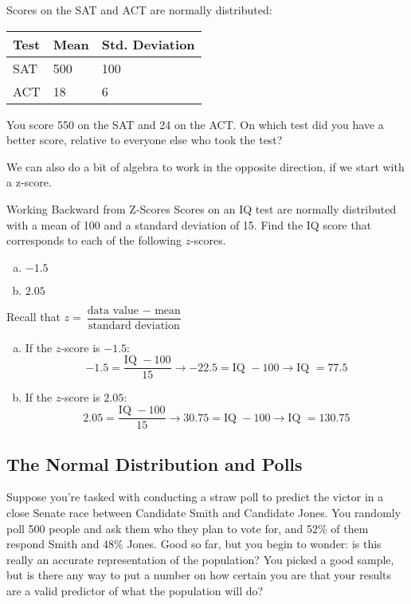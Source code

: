 \begin{try}
Scores on the SAT and ACT are normally distributed:
\begin{center}
\begin{tabular}{l l l}
Test & Mean & Std. Deviation\\
\hline
SAT & 500 & 100\\
ACT & 18 & 6
\end{tabular}
\end{center}
You score 550 on the SAT and 24 on the ACT.  On which test did you have a better score, relative to everyone else who took the test?
\end{try}

We can also do a bit of algebra to work in the opposite direction, if we start with a z-score.

\begin{example}[https://www.youtube.com/watch?v=qfg_DWgY3Hg&list=PLfmpjsIzhzttL_Uec2nCbDRcAcUF7NKG8&index=27]{Working Backward from Z-Scores}
Scores on an IQ test are normally distributed with a mean of 100 and a standard deviation of 15.  Find the IQ score that corresponds to each of the following $z$-scores.
\begin{enumerate}[(a)]
\item $-1.5$
\item $2.05$
\end{enumerate}

\sol
Recall that $z=\dfrac{\textrm{data value } - \textrm{ mean}}{\textrm{standard deviation}}$
\begin{enumerate}[(a)]
\item If the $z$-score is $-1.5$:
\[-1.5=\dfrac{\textrm{IQ } - 100}{15} \longrightarrow -22.5 = \textrm{IQ } - 100 \longrightarrow \textrm{IQ } = \boxed{77.5}\]
\item If the $z$-score is $2.05$:
\[2.05=\dfrac{\textrm{IQ } - 100}{15} \longrightarrow 30.75 = \textrm{IQ } - 100 \longrightarrow \textrm{IQ } = \boxed{130.75}\]
\end{enumerate}
\end{example}
\pagebreak

\subsection{The Normal Distribution and Polls}
Suppose you're tasked with conducting a straw poll to predict the victor in a close Senate race between Candidate Smith and Candidate Jones.  You randomly poll 500 people and ask them who they plan to vote for, and 52\% of them respond Smith and 48\% Jones.  Good so far, but you begin to wonder: is this really an accurate representation of the population?  You picked a good sample, but is there any way to put a number on how certain you are that your results are a valid predictor of what the population will do?

